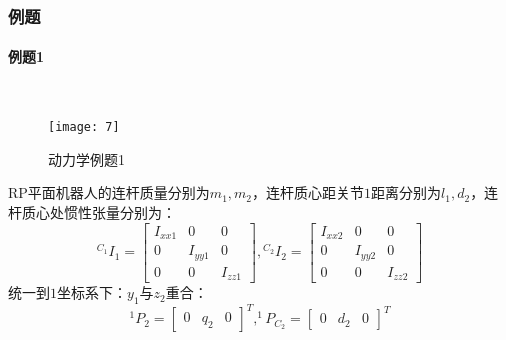 \documentclass[
12pt, %
a4paper, 
oneside, %
headinclude,footinclude, %
]{scrartcl}
\begin{document}
\subsubsection[例题]{例题}
{\footnotesize
\paragraph{例题1}~\\
\begin{minipage}{0.35\textwidth}
\begin{figure}[H]
\centering 
\texttt{[image: 7]} 
\caption[动力学例题1]{动力学例题1}
\end{figure}
\end{minipage}
\hfill
\begin{minipage}{0.6\textwidth}
\hspace{2em}
RP平面机器人的连杆质量分别为$ m_1,m_2 $，连杆质心距关节$ 1 $距离分别为$ l_1,d_2 $，连杆质心处惯性张量分别为：
$$
{^{C_1}}I_1 = \begin{bmatrix} I_{xx1} & 0 & 0 \\ 0 & I_{yy1} & 0 \\ 0 & 0 & I_{zz1} \end{bmatrix},
{^{C_2}}I_2 = \begin{bmatrix}  I_{xx2} & 0 & 0 \\ 0 & I_{yy2} & 0 \\ 0 & 0 & I_{zz2} \end{bmatrix}
$$
\hspace{2em}
统一到$ 1 $坐标系下：$ y_1 $与$ z_2 $重合：
$$ ^1P_2 = \begin{bmatrix} 0 & q_2 & 0 \end{bmatrix}^T, ^1P_{C_2} = \begin{bmatrix} 0 & d_2 & 0 \end{bmatrix}^T $$
\end{minipage}
}
\end{document}
